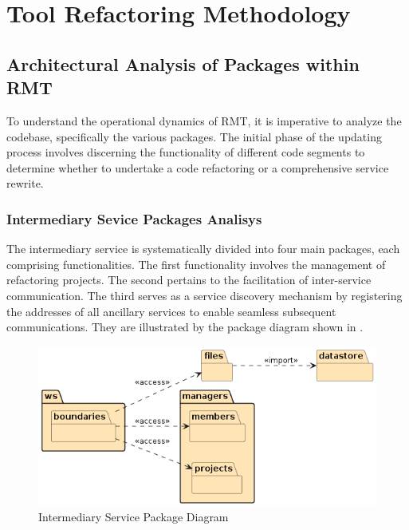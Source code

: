 \chapter{Tool Refactoring Methodology}%
\label{methodology}

\section{Architectural Analysis of Packages within RMT}

To understand the operational dynamics of RMT, it is imperative to analyze the codebase, specifically the various packages. The initial phase of the updating process involves discerning the functionality of different code segments to determine whether to undertake a code refactoring or a comprehensive service rewrite.

\subsection{Intermediary Sevice Packages Analisys}
\label{sub-intermediary-packages}
The intermediary service is systematically divided into four main packages, each comprising functionalities. The first functionality involves the management of refactoring projects. The second pertains to the facilitation of inter-service communication. The third serves as a service discovery mechanism by registering the addresses of all ancillary services to enable seamless subsequent communications. They are illustrated by the package diagram shown in .

\begin{figure}[ht!]
\SetCaptionWidth{\textwidth}
\caption{Intermediary Service Package Diagram}
\label{fig-package-intermediary}
\includegraphics[width =\textwidth, scale=0.2]{Chapter-4/Figures/intermediary-service.png}
\end{figure}
\FloatBarrier

